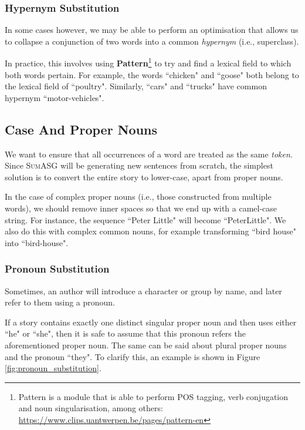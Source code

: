 \subsubsection*{Hypernym Substitution}

In some cases however, we may be able to perform an optimisation that allows us to collapse a conjunction of two words into a common \textit{hypernym} (i.e., superclass).

In practice, this involves using \textbf{Pattern}\footnote{\label{footnote:pattern}Pattern is a module that is able to perform POS tagging, verb conjugation and noun singularisation, among others: \url{https://www.clips.uantwerpen.be/pages/pattern-en}} to try and find a lexical field to which both words pertain. For example, the words ``chicken" and ``goose" both belong to the lexical field of ``poultry". Similarly, ``cars" and ``trucks" have common hypernym ``motor-vehicles".

\subsection{Case And Proper Nouns}

We want to ensure that all occurrences of a word are treated as the same \textit{token}. Since \textsc{SumASG} will be generating new sentences from scratch, the simplest solution is to convert the entire story to lower-case, apart from proper nouns.

In the case of complex proper nouns (i.e., those constructed from multiple words), we should remove inner spaces so that we end up with a camel-case string. For instance, the sequence ``Peter Little" will become ``PeterLittle". We also do this with complex common nouns, for example transforming ``bird house" into ``bird-house".

\subsubsection*{Pronoun Substitution}

Sometimes, an author will introduce a character or group by name, and later refer to them using a pronoun.

If a story contains exactly one distinct singular proper noun and then uses either ``he" or ``she", then it is safe to assume that this pronoun refers the aforementioned proper noun. The same can be said about plural proper nouns and the pronoun ``they".
To clarify this, an example is shown in Figure \ref{fig:pronoun_substitution}.

